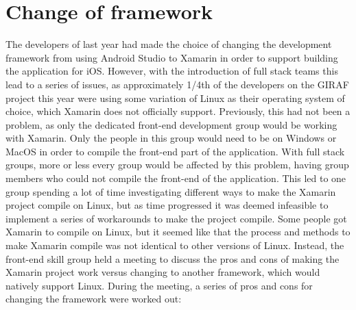 \section{Change of framework}\label{change-of-framework}
The developers of last year had made the choice of changing the development framework from using Android Studio to Xamarin in order to support building the application for iOS.
However, with the introduction of full stack teams this lead to a series of issues, as approximately 1/4th of the developers on the GIRAF project this year were using some variation of Linux as their operating system of choice, which Xamarin does not officially support.
Previously, this had not been a problem, as only the dedicated front-end development group would be working with Xamarin. 
Only the people in this group would need to be on Windows or MacOS in order to compile the front-end part of the application.
With full stack groups, more or less every group would be affected by this problem, having group members who could not compile the front-end of the application.
This led to one group spending a lot of time investigating different ways to make the Xamarin project compile on Linux, but as time progressed it was deemed infeasible to implement a series of workarounds to make the project compile.
Some people got Xamarin to compile on Linux, but it seemed like that the process and methods to make Xamarin compile was not identical to other versions of Linux.
Instead, the front-end skill group held a meeting to discuss the pros and cons of making the Xamarin project work versus changing to another framework, which would natively support Linux.
During the meeting, a series of pros and cons for changing the framework were worked out:

